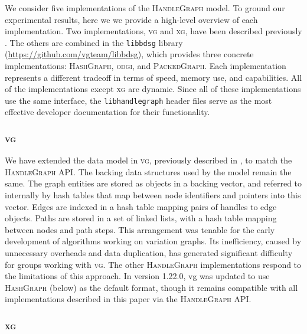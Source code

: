 \documentclass{bioinfo}
\begin{document}
\begin{methods}
We consider five implementations of the \textsc{HandleGraph} model.
To ground our experimental results, here we we provide a high-level overview of each implementation.
Two implementations, \textsc{vg} and \textsc{xg}, have been described previously \citep{Garrison_2018,Garrison_2019}.
The others are combined in the \texttt{libbdsg} library (\url{https://github.com/vgteam/libbdsg}), which provides three concrete implementations: \textsc{HashGraph}, \textsc{odgi}, and \textsc{PackedGraph}.
Each implementation represents a different tradeoff in terms of speed, memory use, and capabilities.
All of the implementations except \textsc{xg} are dynamic.
Since all of these implementations use the same interface, the \texttt{libhandlegraph} header files serve as the most effective developer documentation for their functionality.

\subsubsection{\textsc{vg}}

We have extended the data model in \textsc{vg}, previously described in \citep{Garrison_2018}, to match the \textsc{HandleGraph} API.
The backing data structures used by the model remain the same.
The graph entities are stored as objects in a backing vector, and referred to internally by hash tables that map between node identifiers and pointers into this vector.
Edges are indexed in a hash table mapping pairs of handles to edge objects.
Paths are stored in a set of linked lists, with a hash table mapping between nodes and path steps.
This arrangement was tenable for the early development of algorithms working on variation graphs.
Its inefficiency, caused by unnecessary overheads and data duplication, has generated significant difficulty for groups working with \textsc{vg}.
The other \textsc{HandleGraph} implementations respond to the limitations of this approach.
In version 1.22.0, vg was updated to use \textsc{HashGraph} (below) as the default format, though it remains compatible with all implementations described in this paper via the \textsc{HandleGraph} API.


\subsubsection{\textsc{xg}}


\end{methods}
\end{document}
